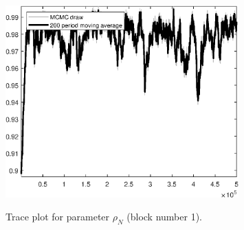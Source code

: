 \begin{figure}[H]
\centering
  \includegraphics[width=0.8\textwidth]{BRS_growth_ext_fd/graphs/TracePlot_rho_N_blck_1}\\
    \caption{Trace plot for parameter ${\rho_N}$ (block number 1).}
\end{figure}
